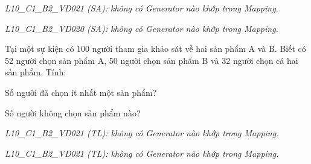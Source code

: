 \documentclass[a4paper,12pt]{article}
\begin{document}
\begin{center}\end{center}

\begin{center}{\small\textit{L10\_C1\_B2\_VD021 (SA): không có Generator nào khớp trong Mapping.}}\end{center}

\begin{center}\end{center}

\begin{center}{\small\textit{L10\_C1\_B2\_VD020 (SA): không có Generator nào khớp trong Mapping.}}\end{center}

\begin{ex}%
Tại một sự kiện có 100 người tham gia khảo sát về hai sản phẩm A và B. Biết có 52 người chọn sản phẩm A, 50 người chọn sản phẩm B và 32 người chọn cả hai sản phẩm. Tính: 
\begin{listEX}[1]
\item Số người đã chọn ít nhất một sản phẩm? 
\item Số người không chọn sản phẩm nào? 
\end{listEX}

\end{ex}

\begin{center}\end{center}

\begin{center}{\small\textit{L10\_C1\_B2\_VD021 (TL): không có Generator nào khớp trong Mapping.}}\end{center}

\begin{center}\end{center}

\begin{center}{\small\textit{L10\_C1\_B2\_VD021 (TL): không có Generator nào khớp trong Mapping.}}\end{center}
\end{document}

